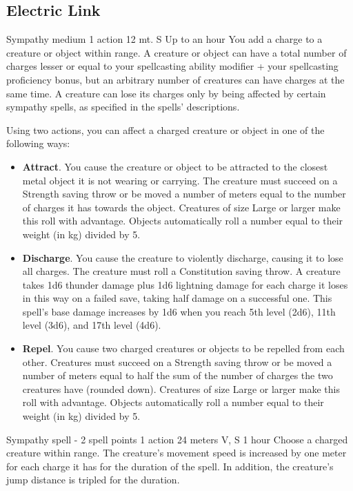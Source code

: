 \subsection*{Electric Link}
        {Sympathy medium}
        {1 action}
        {12 mt.}
        {S}
        {Up to an hour}
        You add a charge to a creature or object within range.
        A creature or object can have a total number of charges lesser or equal to your spellcasting ability modifier + your spellcasting proficiency bonus, but an arbitrary number of creatures can have charges at the same time.
        A creature can lose its charges only by being affected by certain sympathy spells, as specified in the spells' descriptions.

        Using two actions, you can affect a charged creature or object in one of the following ways:
        \begin{itemize}
            \item \textbf{Attract}.
            You cause the creature or object to be attracted to the closest metal object it is not wearing or carrying.
            The creature must succeed on a Strength saving throw or be moved a number of meters equal to the number of charges it has towards the object.
            Creatures of size Large or larger make this roll with advantage.
            Objects automatically roll a number equal to their weight (in kg) divided by 5.
            \item \textbf{Discharge}.
            You cause the creature to violently discharge, causing it to lose all charges.
            The creature must roll a Constitution saving throw.
            A creature takes 1d6 thunder damage plus 1d6 lightning damage for each charge it loses in this way on a failed save, taking half damage on a successful one.
            This spell's base damage increases by 1d6 when you reach 5th level (2d6), 11th level (3d6), and 17th level (4d6).
            \item \textbf{Repel}.
            You cause two charged creatures or objects to be repelled from each other.
            Creatures must succeed on a Strength saving throw or be moved a number of meters equal to half the sum of the number of charges the two creatures have (rounded down).
            Creatures of size Large or larger make this roll with advantage.
            Objects automatically roll a number equal to their weight (in kg) divided by 5.
        \end{itemize}
        {Sympathy spell - 2 spell points}
        {1 action}
        {24 meters}
        {V, S}
        {1 hour}
        Choose a charged creature within range.
        The creature's movement speed is increased by one meter for each charge it has for the duration of the spell.
        In addition, the creature's jump distance is tripled for the duration.


